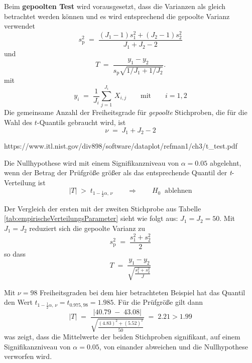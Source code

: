 Beim \textbf{gepoolten Test} wird vorausgesetzt, dass die
Varianzen als gleich betrachtet werden können und es wird
entsprechend die gepoolte Varianz verwendet
\begin{equation}
s_\mathrm{p}^2 \; = \; \frac{(J_1-1)s_1^2+(J_2-1)s_2^2}{J_1+J_2-2}
\end{equation}
und
\begin{equation}
T \; = \; \frac{y_1-y_2}{s_\mathrm{p}\sqrt{1/J_1+1/J_2}} .
\label{tTestPooled}
\end{equation}
mit
\begin{equation}
y_i \; = \; \frac{1}{J_i}\sum_{j=1}^{J_i} \, X_{i,j} \qquad \mathrm{mit} \qquad
i = 1, 2
\end{equation}
Die gemeinsame Anzahl der Freiheitsgrade für \textsl{gepoolte} Stichproben, die für die Wahl des $t$-Quantils gebraucht wird, ist
\begin{equation}
\nu \; = \; J_1 + J_2 - 2
\label{dofpooled}
\end{equation}

https://www.itl.nist.gov/div898/software/dataplot/refman1/ch3/t\_test.pdf

Die Nullhypothese wird mit einem Signifikanzniveau von $\alpha = 0.05$ abgelehnt, wenn
der Betrag der Prüfgröße größer als das entsprechende Quantil der \textsl{t}-Verteilung ist
\begin{equation}
|T| \; > \; t_{1-\frac{1}{2} \alpha, \, \nu} \qquad \Rightarrow \qquad H_0 \; \; \mathrm{ablehnen}
\end{equation}

Der Vergleich der ersten mit der zweiten Stichprobe aus Tabelle \ref{tab:empirischeVerteilungsParameter} sieht wie folgt aus: $J_1 = J_2 = 50$. Mit $J_1 = J_2$ reduziert sich die gepoolte Varianz zu 
$$
s_\mathrm{p}^2 \; = \; \frac{s_1^2+s_2^2}{2}
$$
so dass
\begin{equation}
T \; = \; \frac{y_1-y_2}{\sqrt{\frac{s_1^2+s_2^2}{J}}}
\end{equation}

Mit $\nu = 98$ Freiheitsgraden bei dem hier betrachteten Beispiel hat das
Quantil den Wert $t_{1-\frac{1}{2} \alpha, \, \nu} = t_{0.975, 98} = 1.985$. Für die Prüfgröße gilt dann
$$
|T| \; = \; \frac{|40.79 \; - \; 43.08|}{\sqrt{\frac{(4.83)^2 + (5.52)^2}{50}}} \; = \; 2.21 > 1.99
$$
was zeigt, dass die Mittelwerte der beiden Stichproben signifikant, auf einem Signifikanzniveau von
$\alpha = 0.05$, von einander abweichen und die Nullhypothese verworfen wird.


